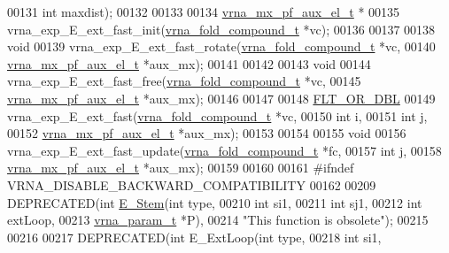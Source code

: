 \begin{DoxyCode}
00131                        \textcolor{keywordtype}{int}                  maxdist);
00132 
00133 
00134 \hyperlink{group__loops_structvrna__mx__pf__aux__el__t}{vrna\_mx\_pf\_aux\_el\_t} *
00135 vrna\_exp\_E\_ext\_fast\_init(\hyperlink{group__fold__compound_structvrna__fc__s}{vrna\_fold\_compound\_t} *vc);
00136 
00137 
00138 \textcolor{keywordtype}{void}
00139 vrna\_exp\_E\_ext\_fast\_rotate(\hyperlink{group__fold__compound_structvrna__fc__s}{vrna\_fold\_compound\_t} *vc,
00140                            \hyperlink{group__loops_structvrna__mx__pf__aux__el__t}{vrna\_mx\_pf\_aux\_el\_t}  *aux\_mx);
00141 
00142 
00143 \textcolor{keywordtype}{void}
00144 vrna\_exp\_E\_ext\_fast\_free(\hyperlink{group__fold__compound_structvrna__fc__s}{vrna\_fold\_compound\_t} *vc,
00145                          \hyperlink{group__loops_structvrna__mx__pf__aux__el__t}{vrna\_mx\_pf\_aux\_el\_t}  *aux\_mx);
00146 
00147 
00148 \hyperlink{group__data__structures_ga31125aeace516926bf7f251f759b6126}{FLT\_OR\_DBL}
00149 vrna\_exp\_E\_ext\_fast(\hyperlink{group__fold__compound_structvrna__fc__s}{vrna\_fold\_compound\_t}  *vc,
00150                     \textcolor{keywordtype}{int}                   i,
00151                     \textcolor{keywordtype}{int}                   j,
00152                     \hyperlink{group__loops_structvrna__mx__pf__aux__el__t}{vrna\_mx\_pf\_aux\_el\_t}   *aux\_mx);
00153 
00154 
00155 \textcolor{keywordtype}{void}
00156 vrna\_exp\_E\_ext\_fast\_update(\hyperlink{group__fold__compound_structvrna__fc__s}{vrna\_fold\_compound\_t} *fc,
00157                            \textcolor{keywordtype}{int}                  j,
00158                            \hyperlink{group__loops_structvrna__mx__pf__aux__el__t}{vrna\_mx\_pf\_aux\_el\_t}  *aux\_mx);
00159 
00160 
00161 \textcolor{preprocessor}{#ifndef VRNA\_DISABLE\_BACKWARD\_COMPATIBILITY}
00162 
00209 DEPRECATED(\textcolor{keywordtype}{int} \hyperlink{group__loops_ga51f9851f3500c2aae66674142a6a2dd5}{E\_Stem}(\textcolor{keywordtype}{int}           type,
00210                       \textcolor{keywordtype}{int}           si1,
00211                       \textcolor{keywordtype}{int}           sj1,
00212                       \textcolor{keywordtype}{int}           extLoop,
00213                       \hyperlink{group__energy__parameters_structvrna__param__s}{vrna\_param\_t}  *P),
00214            \textcolor{stringliteral}{"This function is obsolete"});
00215 
00216 
00217 DEPRECATED(\textcolor{keywordtype}{int} E\_ExtLoop(\textcolor{keywordtype}{int}          type,
00218                          \textcolor{keywordtype}{int}          si1,

\end{DoxyCode}
